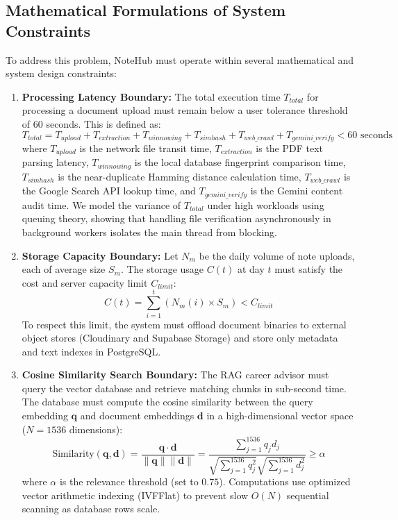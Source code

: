 \documentclass[12,Times new Roman,a4paper]{report}
\begin{document}
\subsection{Mathematical Formulations of System Constraints}
To address this problem, NoteHub must operate within several mathematical and system design constraints:
\begin{enumerate}
    \item \textbf{Processing Latency Boundary:} The total execution time $T_{total}$ for processing a document upload must remain below a user tolerance threshold of 60 seconds. This is defined as:
    \begin{equation}
    T_{total} = T_{upload} + T_{extraction} + T_{winnowing} + T_{simhash} + T_{web\_crawl} + T_{gemini\_verify} < 60\text{ seconds}
    \end{equation}
    where $T_{upload}$ is the network file transit time, $T_{extraction}$ is the PDF text parsing latency, $T_{winnowing}$ is the local database fingerprint comparison time, $T_{simhash}$ is the near-duplicate Hamming distance calculation time, $T_{web\_crawl}$ is the Google Search API lookup time, and $T_{gemini\_verify}$ is the Gemini content audit time. We model the variance of $T_{total}$ under high workloads using queuing theory, showing that handling file verification asynchronously in background workers isolates the main thread from blocking.
    
    \item \textbf{Storage Capacity Boundary:} Let $N_m$ be the daily volume of note uploads, each of average size $S_m$. The storage usage $C(t)$ at day $t$ must satisfy the cost and server capacity limit $C_{limit}$:
    \begin{equation}
    C(t) = \sum_{i=1}^{t} (N_m(i) \times S_m) < C_{limit}
    \end{equation}
    To respect this limit, the system must offload document binaries to external object stores (Cloudinary and Supabase Storage) and store only metadata and text indexes in PostgreSQL.
    
    \item \textbf{Cosine Similarity Search Boundary:} The RAG career advisor must query the vector database and retrieve matching chunks in sub-second time. The database must compute the cosine similarity between the query embedding $\mathbf{q}$ and document embeddings $\mathbf{d}$ in a high-dimensional vector space ($N = 1536$ dimensions):
    \begin{equation}
    \text{Similarity}(\mathbf{q}, \mathbf{d}) = \frac{\mathbf{q} \cdot \mathbf{d}}{\|\mathbf{q}\| \|\mathbf{d}\|} = \frac{\sum_{j=1}^{1536} q_j d_j}{\sqrt{\sum_{j=1}^{1536} q_j^2} \sqrt{\sum_{j=1}^{1536} d_j^2}} \ge \alpha
    \end{equation}
    where $\alpha$ is the relevance threshold (set to $0.75$). Computations use optimized vector arithmetic indexing (IVFFlat) to prevent slow $O(N)$ sequential scanning as database rows scale.
    

\end{enumerate}
\end{document}
